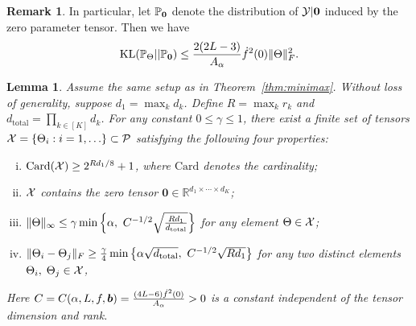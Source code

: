 \documentclass[11pt]{article}
\theoremstyle{plain}
\newtheorem{lem}{Lemma}
\theoremstyle{definition}
\newtheorem{rmk}{Remark}
\begin{document}
\begin{rmk} In particular, let $\mathbb{P}_{\bf{0}}$ denote the distribution of $\mathcal{Y}|\bf{0}$ induced by the zero parameter tensor. Then we have
\[
\text{KL}(\mathbb{P}_{\Theta}||\mathbb{P}_{\bf{0}})\leq {2(2L-3)\over A_\alpha}  \dot{f}^2(0)\lVert\Theta\rVert_F^2.
\]
\end{rmk}


\begin{lem}\label{lem:construction}
Assume the same setup as in Theorem~\ref{thm:minimax}. Without loss of generality, suppose $d_1=\max_kd_k$. Define $R=\max_k r_k$ and $d_{\text{total}}=\prod_{k\in[K]} d_k$. For any constant $0\leq \gamma \leq 1$, there exist a finite set of tensors $\mathcal{X}=\{\Theta_i: i=1,\ldots\}\subset \mathcal{P}$ satisfying the following four properties:
 \begin{enumerate} [(i)]
\item $\text{Card}(\mathcal{X})\geq 2^{Rd_1/8}+1$, where $\text{Card}$ denotes the cardinality;
\item $\mathcal{X}$ contains the zero tensor $\mathbf{0}\in\mathbb{R}^{d_1\times \cdots\times d_K}$;
\item $\lVert\Theta\rVert_\infty\leq \gamma \min\left\{ \alpha ,\ C^{-1/2}\sqrt{Rd_1\over d_{\text{total}}} \right\} $ for any element $\Theta\in\mathcal{X}$;
\item $\FnormSize{}{\Theta_i-\Theta_j}\geq {\gamma\over 4} \min\left\{ \alpha\sqrt{d_{\text{total}}},\ C^{-1/2}\sqrt{Rd_1}\right\}$ for any two distinct elements $\Theta_i,\; \Theta_j\in\mathcal{X}$,
 \end{enumerate} 
Here $C=C(\alpha,L,f,\bm{b})={(4L-6)\dot{f}^2(0)\over A_\alpha }>0$ is a constant independent of the tensor dimension and rank.
\end{lem}
\end{document}
